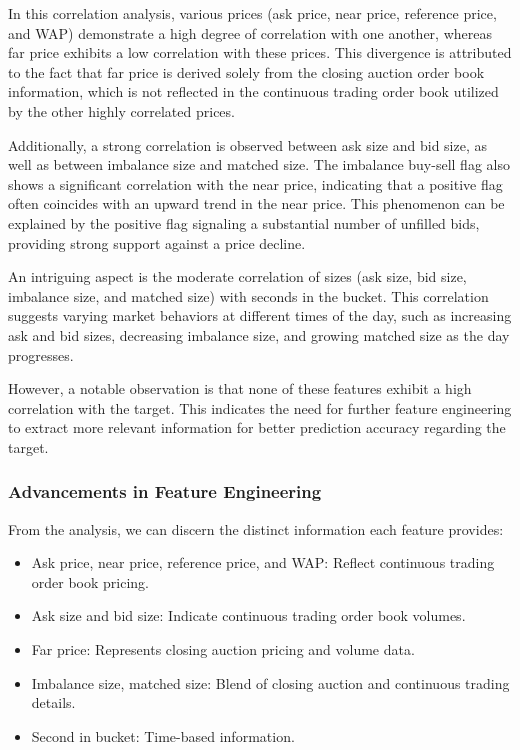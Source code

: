 \documentclass[12pt]{article}
\newtheorem{Proof of Lemma}{Proof of Lemma}
\begin{document}
In this correlation analysis, various prices (ask price, near price, reference price, and WAP) demonstrate a high degree of correlation with one another, whereas far price exhibits a low correlation with these prices. This divergence is attributed to the fact that far price is derived solely from the closing auction order book information, which is not reflected in the continuous trading order book utilized by the other highly correlated prices.

Additionally, a strong correlation is observed between ask size and bid size, as well as between imbalance size and matched size. The imbalance buy-sell flag also shows a significant correlation with the near price, indicating that a positive flag often coincides with an upward trend in the near price. This phenomenon can be explained by the positive flag signaling a substantial number of unfilled bids, providing strong support against a price decline.

An intriguing aspect is the moderate correlation of sizes (ask size, bid size, imbalance size, and matched size) with seconds in the bucket. This correlation suggests varying market behaviors at different times of the day, such as increasing ask and bid sizes, decreasing imbalance size, and growing matched size as the day progresses.

However, a notable observation is that none of these features exhibit a high correlation with the target. This indicates the need for further feature engineering to extract more relevant information for better prediction accuracy regarding the target.

\subsubsection*{Advancements in Feature Engineering}

From the analysis, we can discern the distinct information each feature provides:
\begin{itemize}
  \item Ask price, near price, reference price, and WAP: Reflect continuous trading order book pricing.
  \item Ask size and bid size: Indicate continuous trading order book volumes.
  \item Far price: Represents closing auction pricing and volume data.
  \item Imbalance size, matched size: Blend of closing auction and continuous trading details.
  \item Second in bucket: Time-based information.
\end{itemize}
\end{document}
